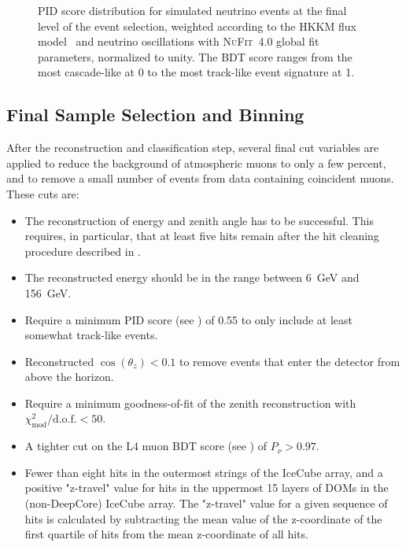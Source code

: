 \begin{figure}
    \centering
    
    \caption{PID score distribution for simulated neutrino events at the final level of the event selection, weighted according to the HKKM flux model~\cite{Honda:2015fha} and neutrino oscillations with \textsc{NuFit}~4.0\cite{nufit40} global fit parameters, normalized to unity. The BDT score ranges from the most cascade-like at 0 to the most track-like event signature at 1.}
    \label{fig:pid-score}
\end{figure}

\subsection{Final Sample Selection and Binning}
\label{sec:final-sample-binning}
After the reconstruction and classification step, several final cut variables are applied to reduce the background of atmospheric muons to only a few percent, and to remove a small number of events from data containing coincident muons.
These cuts are:
\begin{itemize}
    \item The reconstruction of energy and zenith angle has to be successful.
This requires, in particular, that at least five hits remain after the hit cleaning procedure described in .
    \item The reconstructed energy should be in the range between \SI{6}{\giga\electronvolt} and \SI{156}{\giga\electronvolt}.
    \item Require a minimum PID score (see ) of 0.55 to only include at least somewhat track-like events.
    \item Reconstructed $\cos(\theta_z) < 0.1$ to remove events that enter the detector from above the horizon.
    \item Require a minimum goodness-of-fit of the zenith reconstruction with $\chi^2_{\mathrm{mod}}/\mathrm{d.o.f.} < 50$.
    \item A tighter cut on the L4 muon BDT score (see ) of $P_\nu > 0.97$.
    \item Fewer than eight hits in the outermost strings of the IceCube array, and a positive "z-travel" value for hits in the uppermost 15 layers of DOMs in the (non-DeepCore) IceCube array.
The "z-travel" value for a given sequence of hits is calculated by subtracting the mean value of the z-coordinate of the first quartile of hits from the mean z-coordinate of all hits.
\end{itemize}

